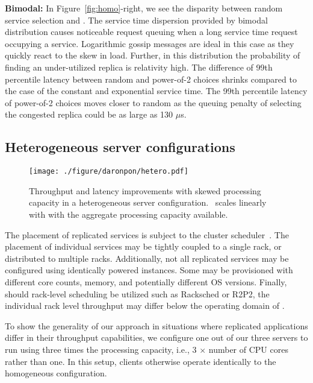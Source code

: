 \noindent\textbf{Bimodal:} In Figure~\ref{fig:homo}-right, we see the disparity between
random service selection and \daronpon. The service time dispersion provided by
bimodal distribution causes noticeable request queuing when a long service time
request occupying a service.  
%
Logarithmic gossip messages are ideal in this case as they quickly react to the skew in load.  
%
Further, in this distribution the probability of finding an under-utilized replica is relativity high.  
%
The difference of 99th percentile latency between random and power-of-2 choices shrinks compared to the case of the constant and exponential service time. 
%
The 99th percentile latency of power-of-2 choices moves closer to random as the queuing penalty of selecting the congested replica could be as large as 130 $\mu$s.  


\subsection{Heterogeneous server configurations}

\begin{figure*}
  \texttt{[image: ./figure/daronpon/hetero.pdf]}

  \caption{Throughput and latency improvements with skewed processing
    capacity in a heterogeneous server configuration. \daronpon\
    scales linearly with with the aggregate processing capacity
    available.}

  \label{fig:hetero}
\end{figure*}

The placement of replicated services is subject to the cluster
scheduler~\cite{facebook_shard,google_slicer,microsoft_service_fabric}.  The
placement of individual services may be tightly coupled to a single rack, or
distributed to multiple racks. Additionally, not all replicated services may be
configured using identically powered instances. Some may be provisioned with
different core counts, memory, and potentially different OS versions.  Finally,
should rack-level scheduling be utilized such as Racksched or R2P2, the
individual rack level throughput may differ below the operating domain of \daronpon.

To show the generality of our approach in situations where replicated
applications differ in their throughput capabilities, we configure one out of
our three servers to run using three times the processing capacity, i.e., 3 $\times$ number of CPU cores rather than one. In this setup, clients otherwise operate identically to
the homogeneous configuration.

